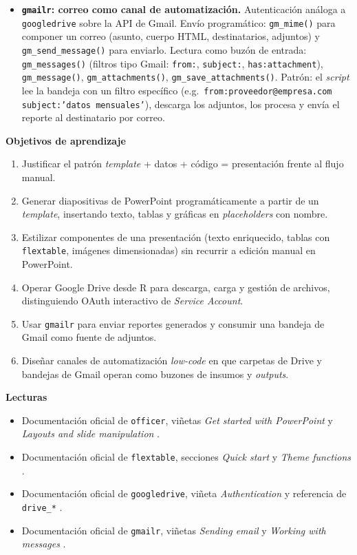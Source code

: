 \documentclass[11pt,letterpaper]{article}
\begin{document}
\begin{itemize}[leftmargin=*, itemsep=2pt]
    \item \textbf{\texttt{gmailr}: correo como canal de automatización.} Autenticación análoga a \texttt{googledrive} sobre la API de Gmail. Envío programático: \texttt{gm\_mime()} para componer un correo (asunto, cuerpo HTML, destinatarios, adjuntos) y \texttt{gm\_send\_message()} para enviarlo. Lectura como buzón de entrada: \texttt{gm\_messages()} (filtros tipo Gmail: \texttt{from:}, \texttt{subject:}, \texttt{has:attachment}), \texttt{gm\_message()}, \texttt{gm\_attachments()}, \texttt{gm\_save\_attachments()}. Patrón: el \textit{script} lee la bandeja con un filtro específico (e.g.\ \texttt{from:proveedor@empresa.com subject:'datos mensuales'}), descarga los adjuntos, los procesa y envía el reporte al destinatario por correo.
\end{itemize}

\medskip
\noindent\textbf{Objetivos de aprendizaje}
\begin{enumerate}[leftmargin=*, itemsep=1pt]
    \item Justificar el patrón \textit{template} + datos + código = presentación frente al flujo manual.
    \item Generar diapositivas de PowerPoint programáticamente a partir de un \textit{template}, insertando texto, tablas y gráficas en \textit{placeholders} con nombre.
    \item Estilizar componentes de una presentación (texto enriquecido, tablas con \texttt{flextable}, imágenes dimensionadas) sin recurrir a edición manual en PowerPoint.
    \item Operar Google Drive desde R para descarga, carga y gestión de archivos, distinguiendo OAuth interactivo de \textit{Service Account}.
    \item Usar \texttt{gmailr} para enviar reportes generados y consumir una bandeja de Gmail como fuente de adjuntos.
    \item Diseñar canales de automatización \textit{low-code} en que carpetas de Drive y bandejas de Gmail operan como buzones de insumos y \textit{outputs}.
\end{enumerate}

\medskip
\noindent\textbf{Lecturas}
\begin{itemize}[leftmargin=*, itemsep=1pt]
    \item Documentación oficial de \texttt{officer}, viñetas \textit{Get started with PowerPoint} y \textit{Layouts and slide manipulation} \cite{gohel-officer}.
    \item Documentación oficial de \texttt{flextable}, secciones \textit{Quick start} y \textit{Theme functions} \cite{gohel-flextable}.
    \item Documentación oficial de \texttt{googledrive}, viñeta \textit{Authentication} y referencia de \texttt{drive\_*} \cite{bryan-googledrive}.
    \item Documentación oficial de \texttt{gmailr}, viñetas \textit{Sending email} y \textit{Working with messages} \cite{hester-gmailr}.
\end{itemize}
\end{document}
